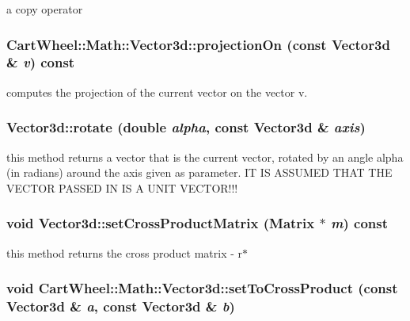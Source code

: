 \label{classCartWheel_1_1Math_1_1Vector3d_a51f18ca24a4f9866923ea9fd85839144}
a copy operator \hypertarget{classCartWheel_1_1Math_1_1Vector3d_ae192e902fc815e3b9fe71cfb169c3876}{
\subsubsection[{projectionOn}]{ CartWheel::Math::Vector3d::projectionOn (const {\bf Vector3d} \& {\em v}) const}}
\label{classCartWheel_1_1Math_1_1Vector3d_ae192e902fc815e3b9fe71cfb169c3876}
computes the projection of the current vector on the vector v. \hypertarget{classCartWheel_1_1Math_1_1Vector3d_a62f9c8629f9b4e6952c90e5abb4a226e}{
\subsubsection[{rotate}]{ Vector3d::rotate (double {\em alpha}, \/  const {\bf Vector3d} \& {\em axis})}}
\label{classCartWheel_1_1Math_1_1Vector3d_a62f9c8629f9b4e6952c90e5abb4a226e}
this method returns a vector that is the current vector, rotated by an angle alpha (in radians) around the axis given as parameter. IT IS ASSUMED THAT THE VECTOR PASSED IN IS A UNIT VECTOR!!! \hypertarget{classCartWheel_1_1Math_1_1Vector3d_ad5f838194669d4521212f5aaba53cc00}{
\subsubsection[{setCrossProductMatrix}]{\setlength{\rightskip}{0pt plus 5cm}void Vector3d::setCrossProductMatrix ({\bf Matrix} $\ast$ {\em m}) const}}
\label{classCartWheel_1_1Math_1_1Vector3d_ad5f838194669d4521212f5aaba53cc00}
this method returns the cross product matrix -\/ r$\ast$ \hypertarget{classCartWheel_1_1Math_1_1Vector3d_abfd7864901a584e868f311a9e13bc7c7}{
\subsubsection[{setToCrossProduct}]{\setlength{\rightskip}{0pt plus 5cm}void CartWheel::Math::Vector3d::setToCrossProduct (const {\bf Vector3d} \& {\em a}, \/  const {\bf Vector3d} \& {\em b})}}

